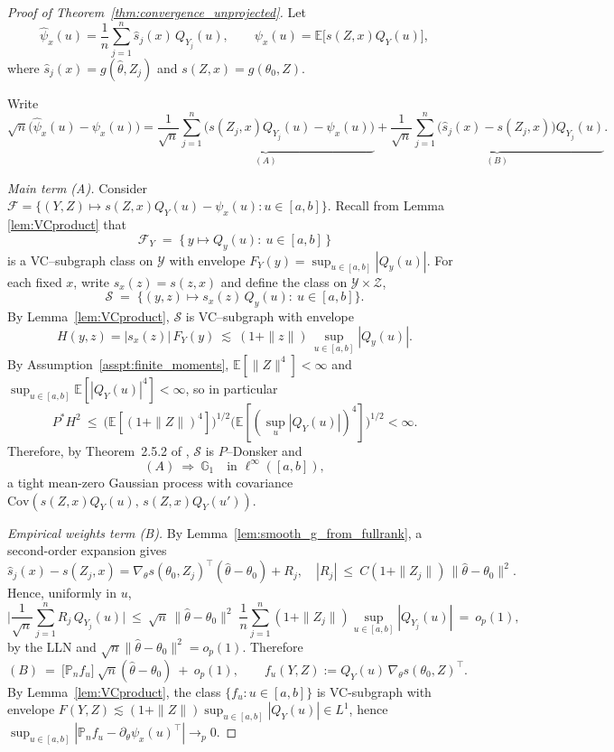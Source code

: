 \documentclass[12pt]{article}
\newcommand{\E}{\mathbb{E}}
\newcommand{\Cov}{\mathrm{Cov}}
\begin{document}
\begin{proof}[Proof of Theorem~\ref{thm:convergence_unprojected}]
Let
\[
\hat\psi_x(u)=\frac{1}{n}\sum_{j=1}^n \hat s_j(x)\,Q_{Y_j}(u),
\qquad
\psi_x(u)=\E\!\big[s(Z,x)Q_Y(u)\big],
\]
where $\hat s_j(x)=g(\hat\theta,Z_j)$ and $s(Z,x)=g(\theta_0,Z)$. 

Write
\[
\sqrt{n}\big(\hat\psi_x(u)-\psi_x(u)\big)
=\underbrace{\frac{1}{\sqrt{n}}\sum_{j=1}^n \Big(s(Z_j,x)Q_{Y_j}(u)-\psi_x(u)\Big)}_{(A)}
+\underbrace{\frac{1}{\sqrt{n}}\sum_{j=1}^n \big(\hat s_j(x)-s(Z_j,x)\big)Q_{Y_j}(u)}_{(B)}.
\]

\textit{Main term  (A).}
Consider $\mathcal{F}=\{(Y,Z)\mapsto s(Z,x)Q_Y(u)-\psi_x(u):u\in[a,b]\}$. 
Recall from Lemma \ref{lem:VCproduct} that
\[
\mathcal{F}_Y
\;=\;
\big\{\,y\mapsto Q_y(u):\ u\in[a,b]\,\big\}
\]
is a VC–subgraph class on $\mathcal{Y}$ with envelope
$F_Y(y)=\sup_{u\in[a,b]}|Q_y(u)|$.  
For each fixed $x$, write $s_x(z)=s(z,x)$ and define the class on $\mathcal{Y}\times\mathcal{Z}$,
\[
\mathcal{S}
\;=\;
\big\{(y,z)\mapsto s_x(z)\,Q_y(u):\ u\in[a,b]\big\}.
\]
By Lemma~\ref{lem:VCproduct},
$\mathcal{S}$ is VC–subgraph with envelope
\[
H(y,z) = |s_x(z)|\,F_Y(y) \ \lesssim\ (1+\|z\|)\,\sup_{u\in[a,b]}|Q_y(u)|.
\]
By Assumption~\ref{asspt:finite_moments}, $\E[\|Z\|^{4}]<\infty$ and $\sup_{u\in[a,b]}\E[|Q_Y(u)|^{4}]<\infty$, so in particular
\[
P^* H^2
\ \le\ 
\big(\E[ (1+\|Z\|)^4 ]\big)^{1/2}
\big(\E[ (\sup_{u}|Q_Y(u)|)^4 ]\big)^{1/2}
<\infty.
\]
Therefore, by Theorem~2.5.2 of \citet{vaart1996weak}, $\mathcal{S}$ is $P$–Donsker and
\[
(A)\ \Rightarrow\ \mathbb{G}_1\quad\text{in }\ell^\infty([a,b]),
\]
a tight mean-zero Gaussian process with covariance 
$\Cov(s(Z,x)Q_Y(u),\,s(Z,x)Q_Y(u'))$.


\textit{Empirical weights term (B).}
By Lemma~\ref{lem:smooth_g_from_fullrank}, a second-order expansion gives
\[
\hat s_j(x)-s(Z_j,x)
=\nabla_\theta s(\theta_0,Z_j)^\top(\hat\theta-\theta_0)+R_j,
\quad
|R_j|\ \le\ C(1+\|Z_j\|)\,\|\hat\theta-\theta_0\|^2.
\]
Hence, uniformly in $u$,
\[
\Big|\frac{1}{\sqrt{n}}\sum_{j=1}^n R_j\,Q_{Y_j}(u)\Big|
\ \le\ \sqrt{n}\,\|\hat\theta-\theta_0\|^2\;\frac{1}{n}\sum_{j=1}^n (1+\|Z_j\|)\sup_{u\in[a,b]}|Q_{Y_j}(u)|
\ =\ o_p(1),
\]
by the LLN and $\sqrt{n}\|\hat\theta-\theta_0\|^2=o_p(1)$. Therefore
\[
(B)\ =\ \Big[\mathbb{P}_n f_u\Big]\ \sqrt{n}(\hat\theta-\theta_0)\ +\ o_p(1),
\qquad
f_u(Y,Z):=Q_Y(u)\,\nabla_\theta s(\theta_0,Z)^\top.
\]
By Lemma~\ref{lem:VCproduct}, the class $\{f_u:u\in[a,b]\}$ is VC-subgraph with envelope
$F(Y,Z)\lesssim (1+\|Z\|)\sup_{u\in[a,b]}|Q_Y(u)|\in L^1$, hence
$\sup_{u\in[a,b]}|\mathbb{P}_n f_u-\partial_\theta\psi_x(u)^\top|\to_p 0$.



\end{proof}
\end{document}
